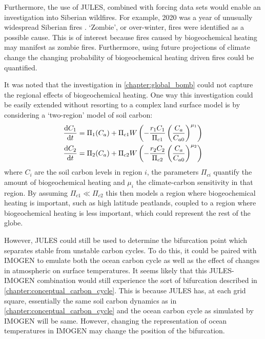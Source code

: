 Furthermore, the use of JULES, combined with forcing data sets would enable an investigation into Siberian wildfires. For example, 2020 was a year of unusually widespread
Siberian fires \parencite{Witze2020}. `Zombie', or over-winter, fires were identified as a possible cause. This is of interest because fires
caused by biogeochemical heating may manifest as zombie fires.
Furthermore, using future projections of climate change the changing probability of biogeochemical heating driven fires could be quantified.

It was noted that the investigation in \cref{chapter:global_bomb} could not capture the regional effects of biogeochemical heating. One way this investigation could be easily extended without
resorting to a complex land surface model is by considering a `two-region' model of soil carbon:
\begin{subequations}
  \label{eq:two_region_model}
  \begin{align}
    \dv{C_1}{t} &= \Pi_1(C_a) + \Pi_{c1} W\left(-\frac{r_1C_1}{\Pi_{c1}} \left(\frac{C_a}{C_{a0}}\right)^{\mu_1} \right) \\
    \dv{C_2}{t} &= \Pi_2(C_a) + \Pi_{c2} W\left(-\frac{r_2C_2}{\Pi_{c2}} \left(\frac{C_a}{C_{a0}}\right)^{\mu_2} \right) \\
  \end{align}
\end{subequations}
where $C_i$ are the soil carbon levels in region $i$, the parameters $\Pi_{ci}$ quantify the amount of biogeochemical heating and $\mu_i$ the climate-carbon sensitivity in that region. By assuming
$\Pi_{c1} \ll \Pi_{c2}$ this then models a region where biogeochemical heating is important, such as high latitude peatlands, coupled to a region where biogeochemical heating is less important,
which could represent the rest of the globe.

However, JULES could still be used to determine the bifurcation point which separates stable from unstable carbon cycles. To do this, it could be paired with IMOGEN to emulate both the
ocean carbon cycle as well as the effect of changes in atmospheric  on surface temperatures. It seems likely that this JULES-IMOGEN combination would still experience the sort of
bifurcation described in \cref{chapter:conceptual_carbon_cycle}. This is because JULES has, at each grid square, essentially the same soil carbon dynamics as in \cref{chapter:conceptual_carbon_cycle}
and the ocean carbon cycle as simulated by IMOGEN will be same. However, changing the representation of ocean temperatures in IMOGEN may change the position of the bifurcation.
 
